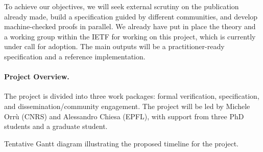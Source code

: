 \documentclass{article}
\begin{document}
To achieve our objectives, we will seek external scrutiny on the publication already made, build a specification guided by different communities, and develop machine-checked proofs in parallel. We already have put in place the theory and a working group within the IETF for working on this project, which is currently under call for adoption. The main outputs will be a practitioner-ready specification and a reference implementation.


\paragraph{Project Overview.}
The project is divided into three work packages: formal verification, specification, and dissemination/community engagement. The project will be led by Michele Orrù (CNRS) and Alessandro Chiesa (EPFL), with support from three PhD students and a graduate student.



\begin{table}[t]
    \def\arraystretch{1.2}%
\centering
\caption{Tentative Gantt diagram illustrating the proposed timeline for the project.}
\end{table}
\end{document}
